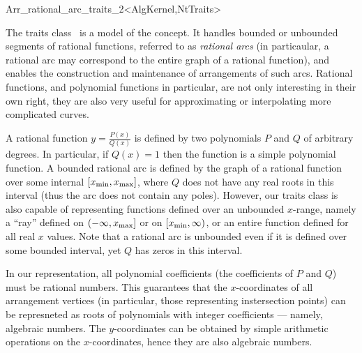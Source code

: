 
\ccRefPageBegin
\begin{ccRefClass}{Arr_rational_arc_traits_2<AlgKernel,NtTraits>}

\ccDefinition

The traits class \ccRefName\ is a model of the 
concept. It handles bounded or unbounded segments of rational functions,
referred to as {\sl rational arcs} (in particaular, a rational arc may
correspond to the entire graph of a rational function), and enables the
construction and maintenance of arrangements of such arcs. Rational
functions, and polynomial functions in particular, are not only interesting
in their own right, they are also very useful for approximating or
interpolating more complicated curves.

A rational function $y = \frac{P(x)}{Q(x)}$
is defined by two polynomials $P$ and $Q$ of arbitrary degrees. In
particular, if $Q(x) = 1$ then the function is a simple polynomial
function. A bounded rational arc is defined by the graph of a rational
function over some internal $[x_{\rm min}, x_{\rm max}]$, where $Q$
does not have any real roots in this interval (thus the arc does not
contain any poles). However, our traits class is also capable of
representing functions defined over an unbounded $x$-range, namely
a ``ray'' defined on $(-\infty, x_{\rm max}]$ or on $[x_{\rm min}, \infty)$,
or an entire function defined for all real $x$ values. Note that a
rational arc is unbounded even if it is defined over some bounded interval,
yet $Q$ has zeros in this interval.

In our representation, all polynomial coefficients (the coefficients of $P$
and $Q$) must be rational numbers. This guarantees that the
$x$-coordinates of all arrangement vertices (in particular, those
representing instersection points) can be represneted as roots of
polynomials with integer coefficients --- namely, algebraic numbers.
The $y$-coordinates can be obtained by simple arithmetic operations on
the $x$-coordinates, hence they are also algebraic numbers.


\end{ccRefClass}

